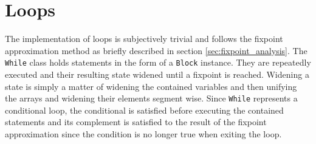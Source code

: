 

\section{Loops}

The implementation of loops is subjectively trivial and follows the fixpoint approximation method \cite{cousot1977} as briefly described in section \ref{sec:fixpoint_analysis}. The \texttt{While} class holds statements in the form of a \texttt{Block} instance. They are repeatedly executed and their resulting state widened until a fixpoint is reached. Widening a state is simply a matter of widening the contained variables and then unifying the arrays and widening their elements segment wise. Since \texttt{While} represents a conditional loop, the conditional is satisfied before executing the contained statements and its complement is satisfied to the result of the fixpoint approximation since the condition is no longer true when exiting the loop.

















